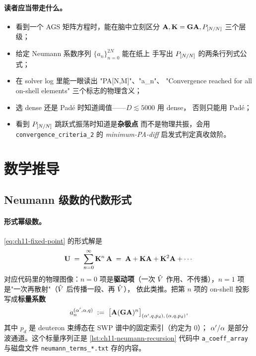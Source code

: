 \paragraph{读者应当带走什么。}
\begin{itemize}
  \item 看到一个 AGS 矩阵方程时，能在脑中立刻区分
        \(\mathbf{A}, \mathbf{K} = \mathbf{G}\mathbf{A}, P_{[N/N]}\)
        三个层级；
  \item 给定 Neumann 系数序列 \(\{a_n\}_{n=0}^{2N}\) 能在纸上
        手写出 \(P_{[N/N]}\) 的两条行列式公式；
  \item 在 solver log 里能一眼读出 "PA[N,M]"、"a\_n"、
        "Convergence reached for all on-shell elements" 三个标志的物理含义；
  \item 选 dense 还是 Padé 时知道阈值——\(D \lesssim 5000\) 用 dense，
        否则只能用 Padé；
  \item 看到 \(P_{[N/N]}\) 跳跃式振荡时知道是\textbf{杂极点}
        而不是物理共振，会用 \texttt{convergence\_criteria\_2}
        的 \emph{minimum-PA-diff} 启发式判定真收敛阶。
\end{itemize}

\section{数学推导}
\label{sec:ch11-math}

\subsection{Neumann 级数的代数形式}
\label{subsec:ch11-neumann-derivation}

\paragraph{形式幂级数。}
\cref{eq:ch11-fixed-point} 的形式解是
\begin{equation}
\label{eq:ch11-neumann-formal}
\mathbf{U} \;=\; \sum_{n=0}^{\infty} \mathbf{K}^n\,\mathbf{A}
\;=\; \mathbf{A} + \mathbf{K}\mathbf{A} + \mathbf{K}^2\mathbf{A} + \cdots
\end{equation}
对应代码里的物理图像：\(n=0\) 项是\textbf{驱动项}（一次 \(\hat{V}\)
作用、不传播），\(n=1\) 项是"一次再散射"（\(\hat{V}\) 后传播一段、再 \(\hat{V}\)），
依此类推。把第 \(n\) 项的 on-shell 投影写成\textbf{标量系数}
\begin{equation}
\label{eq:ch11-neumann-scalar}
a_n^{(\alpha',\alpha,q)} \;:=\;
\bigl[\mathbf{A} (\mathbf{G} \mathbf{A})^n\bigr]_{(\alpha',q,p_d),\,(\alpha,q,p_d)},
\end{equation}
其中 \(p_d\) 是 deuteron 束缚态在 SWP 谱中的固定索引（约定为 0）；
\(\alpha'/\alpha\) 是部分波通道。这个标量序列正是
\cref{lst:ch11-neumann-recursion} 代码中 \texttt{a\_coeff\_array} 与磁盘文件
\texttt{neumann\_terms\_*.txt} 存的内容。

